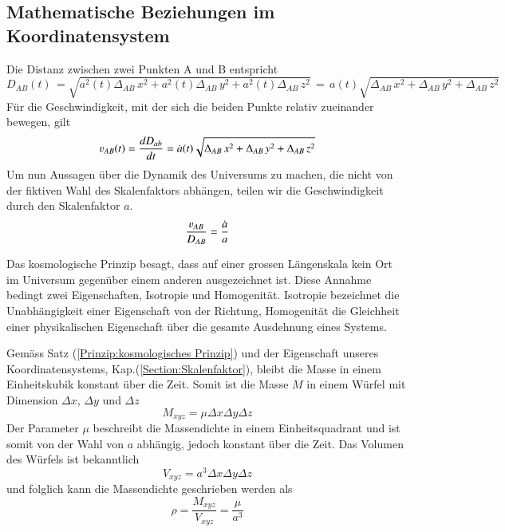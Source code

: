 \begin{refsection}
\subsection{Mathematische Beziehungen im Koordinatensystem \label{friedmann:Beziehungen im Koordinatensystem}}
Die Distanz zwischen zwei Punkten A und B entspricht 
\begin{equation}
D_{AB}(t)\, = \sqrt{a^2(t)\Delta_{AB}\,x^2 + a^2(t)\Delta_{AB}\,y^2 + a^2(t)\Delta_{AB}\,z^2}\, =\, a(t) \sqrt{\Delta_{AB}\,x^2 + \Delta_{AB}\,y^2 + \Delta_{AB}\,z^2}
\end{equation}
F\"{u}r die Geschwindigkeit, mit der sich die beiden Punkte relativ zueinander bewegen, gilt 
\begin{equation}
\varv_{AB}(t) = \dfrac{dD_{ab}}{dt} 
= \dot{a}(t) \sqrt{\Delta_{AB}\,x^2 + \Delta_{AB}\,y^2 + \Delta_{AB}\,z^2}
\end{equation}
Um nun Aussagen über die Dynamik des Universums zu machen, die nicht von der fiktiven Wahl des Skalenfaktors abhängen, teilen wir die Geschwindigkeit durch den Skalenfaktor $a$.
\begin{equation}
\frac{\varv_{AB} }{D_{AB}} = \frac{\dot{a}}{a}
\label{friedmann:geschwindigkeit}
\end{equation}
\begin{satz}
\label{Prinzip:kosmologisches Prinzip}
Das kosmologische Prinzip besagt, dass auf einer grossen Längenskala kein Ort im Universum gegenüber einem anderen ausgezeichnet ist. Diese Annahme bedingt zwei Eigenschaften, Isotropie und Homogenität. Isotropie  bezeichnet die Unabhängigkeit einer Eigenschaft von der Richtung, Homogenität die Gleichheit einer physikalischen Eigenschaft über die gesamte Ausdehnung eines Systems.
\end{satz}
Gemäss Satz (\ref{Prinzip:kosmologisches Prinzip}) und der Eigenschaft unseres Koordinatensystems, Kap.(\ref{Section:Skalenfaktor}), bleibt die Masse in einem Einheitskubik konstant über die Zeit. Somit ist die Masse $M$ in einem Würfel mit Dimension $\Delta x$, $\Delta y$ und $\Delta z$ 
\begin{equation}
M_{xyz} = \mu \Delta x \Delta y \Delta z
\end{equation}
Der Parameter $\mu$ beschreibt die Massendichte in einem Einheitsquadrant und ist somit von der Wahl von $a$ abhängig, jedoch konstant über die Zeit. Das Volumen des Würfels ist bekanntlich
\begin{equation}
V_{xyz} = a^3 \Delta x \Delta y \Delta z
\end{equation}
und folglich kann die Massendichte geschrieben werden als
\begin{equation}
\rho = \frac{M_{xyz}}{V_{xyz}} = \frac{\mu}{a^3}
\label{friedmann:dichte}
\end{equation}


\end{refsection}
